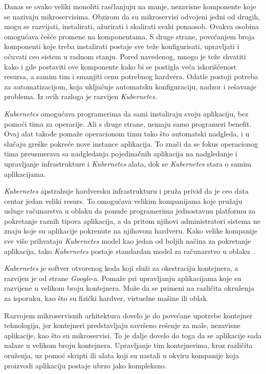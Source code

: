 Danas se ovako veliki monoliti rasčlanjuju na manje, nezavisne komponente koje se nazivaju mikroservisima. Obzirom
da su mikroservisi odvojeni jedni od drugih, mogu se razvijati, instalirati, ažurirati i skalirati svaki ponaosob.
Ovakva osobina omogućava češće promene na komponentama. S druge strane, povećanjem broja komponenti koje treba 
instalirati postaje sve teže konfigurisati, upravljati i očuvati ceo sistem u radnom stanju. Pored navedenog, mnogo 
je teže shvatiti kako i gde postaviti ove komponente kako bi se postigla veća iskorišćenost resursa, a samim tim i 
smanjiti cenu potrebnog hardvera. Odatle postoji potreba za automatizacijom, koja uključuje automatsku konfiguraciju,
nadzor  i rešavanje problema. Iz ovih razloga je razvijen \textit{Kubernetes}.

\textit{Kubernetes} omogućava programerima da sami instaliraju svoju aplikaciju, bez pomoći tima za operacije. Ali s druge 
strane, nemaju samo programeri benefit. Ovaj alat takođe pomaže operacionom timu tako što automatski nadgleda, 
i u slučaju greške pokreće nove instance aplikacija. To znači da se fokus operacionog tima preusmerava sa nadgledanja
pojedinačnih aplikacija na nadgledanje i upravljanje infrastrukture i \textit{Kubernetes} alata, dok se \textit{Kubernetes} stara o samim
aplikacijama.

\textit{Kubernetes} apstrahuje hardversku infrastrukturu i pruža privid da je ceo data centar jedan veliki resurs. To omogućava
velikim kompanijama koje pružaju usluge računarstva u oblaku da ponude programerima jednostavnu platformu za pokretanje
raznih tipova aplikacija, a da pritom njihovi administratori sistema ne znaju koje su aplikacije pokrenute na njihovom
hardveru. Kako velike kompanije sve više prihvataju \textit{Kubernetes} model kao jedan od boljih načina za pokretanje aplikacija,
tako \textit{Kubernetes} postaje standardan model za računarstvo u oblaku~\cite{KIA}.

\textit{Kubernetes} je softver otvorenog koda koji služi za okestraciju kontejnera, a razvijen je od 
strane \textit{Google}-a. Pomaže pri upravljanju aplikacijama koje su razvijene u velikom broju 
kontejnera. Može da se primeni na različita okruženja za isporuku, kao što su fizički 
hardver, virtuelne mašine ili oblak.

Razvojem mikroservisnih arhitektura dovelo je do povećane upotrebe kontejner tehnologija, jer 
kontejneri predstavljaju savršeno rešenje za male, nezavisne aplikacije, kao što su mikroservisi. 
To je dalje dovelo do toga da se aplikacije sada nalaze u velikom broju kontejnera. Upravljanje 
tim kontejnerima, kroz različita oruženja, uz pomoć skripti ili alata koji su nastali u okviru 
kompanije koja proizvodi aplikaciju postaje ubrzo jako kompleksno.


